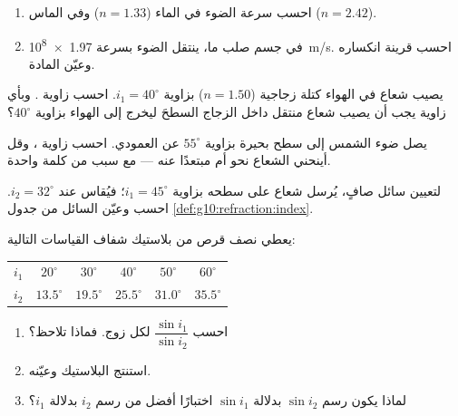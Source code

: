 \begin{exercise}[$\star$]\label{exo:g10:refraction:2}
\begin{enumerate}
  \item احسب سرعة الضوء في الماء ($n = 1.33$) وفي الماس
        ($n = 2.42$).
  \item في جسم صلب ما، ينتقل الضوء بسرعة \qty{1.97e8}{m/s}. احسب
        قرينة انكساره وعيّن المادة.
\end{enumerate}
\end{exercise}

\begin{exercise}[$\star$]\label{exo:g10:refraction:3}
يصيب شعاع في الهواء كتلة زجاجية ($n = 1.50$) بزاوية $i_1 = 40^\circ$.
احسب زاوية . وبأي زاوية يجب أن يصيب شعاع منتقل
داخل الزجاج السطحَ ليخرج إلى الهواء بزاوية
$40^\circ$؟
\end{exercise}

\begin{exercise}[$\star$]\label{exo:g10:refraction:4}
يصل ضوء الشمس إلى سطح بحيرة بزاوية $55^\circ$ عن العمودي.
احسب زاوية ، وقل أينحني الشعاع
نحو  أم مبتعدًا عنه --- مع سبب من كلمة واحدة.
\end{exercise}

\begin{exercise}[$\star$]\label{exo:g10:refraction:5}
لتعيين سائل صافٍ، يُرسل شعاع على سطحه بزاوية
$i_1 = 45^\circ$؛ فيُقاس  عند $i_2 = 32^\circ$.
احسب  وعيّن السائل من جدول
\cref{def:g10:refraction:index}.
\end{exercise}

\begin{exercise}[$\star\star$]\label{exo:g10:refraction:6}
يعطي نصف قرص من بلاستيك شفاف القياسات التالية:
\begin{center}
\begin{tabular}{lccccc}
$i_1$ & $20^\circ$ & $30^\circ$ & $40^\circ$ & $50^\circ$ & $60^\circ$ \\
$i_2$ & $13.5^\circ$ & $19.5^\circ$ & $25.5^\circ$ & $31.0^\circ$
      & $35.5^\circ$ \\
\end{tabular}
\end{center}
\begin{enumerate}
  \item احسب $\dfrac{\sin i_1}{\sin i_2}$ لكل زوج. فماذا
        تلاحظ؟
  \item استنتج  البلاستيك وعيّنه.
  \item لماذا يكون رسم $\sin i_2$ بدلالة $\sin i_1$ اختبارًا 
        أفضل من رسم $i_2$ بدلالة $i_1$؟
\end{enumerate}
\end{exercise}

